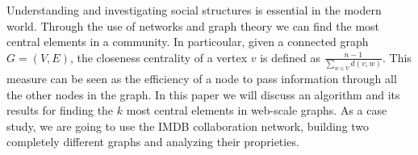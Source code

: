 Understanding and investigating social structures is essential in the modern world. Through the use of networks and graph theory we can find the most central elements in a community. In particoular, given a connected graph $G=(V,E)$, the closeness centrality of a vertex $v$ is defined as $ \frac{n-1}{\sum_{w \in V} d(v,w)}$. This measure can be seen as the efficiency of a node to pass information through all the other nodes in the graph. In this paper we will discuss an algorithm and its results for finding the $k$ most central elements in web-scale graphs. As a case study, we are going to use the IMDB collaboration network, building two completely different graphs and analyzing their proprieties.


